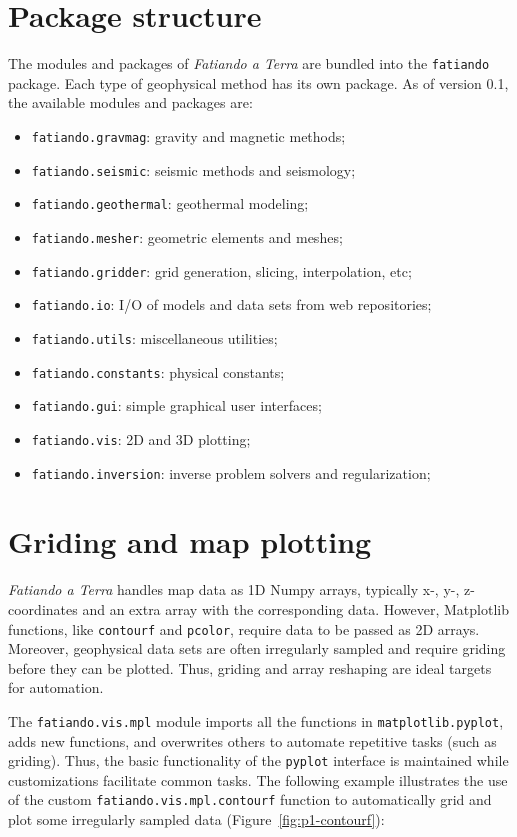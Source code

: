 \section{Package structure}

The modules and packages of \textit{Fatiando a Terra} are bundled into the
\texttt{fatiando} package. Each type of geophysical method has its own
package. As of version 0.1, the available modules and packages are:

\begin{itemize}
\item
  \texttt{fatiando.gravmag}: gravity and magnetic methods;
\item
  \texttt{fatiando.seismic}: seismic methods and seismology;
\item
  \texttt{fatiando.geothermal}: geothermal modeling;
\item
  \texttt{fatiando.mesher}: geometric elements and meshes;
\item
  \texttt{fatiando.gridder}: grid generation, slicing, interpolation,
  etc;
\item
  \texttt{fatiando.io}: I/O of models and data sets from web
  repositories;
\item
  \texttt{fatiando.utils}: miscellaneous utilities;
\item
  \texttt{fatiando.constants}: physical constants;
\item
  \texttt{fatiando.gui}: simple graphical user interfaces;
\item
  \texttt{fatiando.vis}: 2D and 3D plotting;
\item
  \texttt{fatiando.inversion}: inverse problem solvers and
  regularization;
\end{itemize}

\section{Griding and map plotting}

\textit{Fatiando a Terra} handles map data as 1D Numpy arrays, typically x-, y-,
z-coordinates and an extra array with the corresponding data. However,
Matplotlib functions, like \texttt{contourf} and \texttt{pcolor},
require data to be passed as 2D arrays. Moreover, geophysical data sets
are often irregularly sampled and require griding before they can be
plotted. Thus, griding and array reshaping are ideal targets for
automation.

The \texttt{fatiando.vis.mpl} module imports all the functions in
\texttt{matplotlib.pyplot}, adds new functions, and overwrites others to
automate repetitive tasks (such as griding). Thus, the basic
functionality of the \texttt{pyplot} interface is maintained while
customizations facilitate common tasks. The following example
illustrates the use of the custom \texttt{fatiando.vis.mpl.contourf}
function to automatically grid and plot some irregularly sampled data
(Figure~\ref{fig:p1-contourf}):

